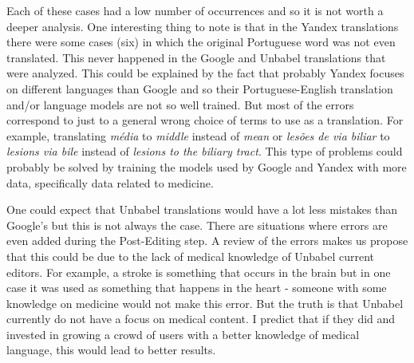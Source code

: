 Each of these cases had a low number of occurrences and so it is not worth a deeper analysis. One interesting thing to note is that in the Yandex translations there were some cases (six) in which the original Portuguese word was not even translated. This never happened in the Google and Unbabel translations that were analyzed. This could be explained by the fact that probably Yandex focuses on different languages than Google and so their Portuguese-English translation and/or language models are not so well trained. But most of the errors correspond to just to a general wrong choice of terms to use as a translation. For example, translating \textit{média} to \textit{middle} instead of \textit{mean} or \textit{lesões de via biliar} to \textit{lesions via bile} instead of \textit{lesions to the biliary tract}. This type of problems could probably be solved by training the models used by Google and Yandex with more data, specifically data related to medicine.

One could expect that Unbabel translations would have a lot less mistakes than Google's but this is not always the case. There are situations where errors are even added during the Post-Editing step. A review of the errors makes us propose that this could be due to the lack of medical knowledge of Unbabel current editors. For example, a stroke is something that occurs in the brain but in one case it was used as something that happens in the heart - someone with some knowledge on medicine would not make this error. But the truth is that Unbabel currently do not have a focus on medical content. I predict that if they did and invested in growing a crowd of users with a better knowledge of medical language, this would lead to better results.


  
